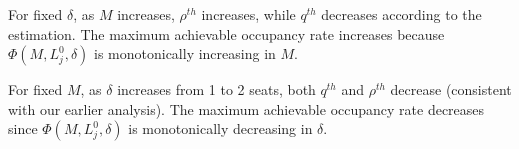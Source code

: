 For fixed $\delta$, as $M$ increases, $\rho^{th}$ increases, while $q^{th}$ decreases according to the estimation. The maximum achievable occupancy rate increases because $\Phi(M, L_j^{0}, \delta)$ is monotonically increasing in $M$.

For fixed $M$, as $\delta$ increases from 1 to 2 seats, both $q^{th}$ and $\rho^{th}$ decrease (consistent with our earlier analysis). The maximum achievable occupancy rate decreases since $\Phi(M, L_j^{0}, \delta)$ is monotonically decreasing in $\delta$.









